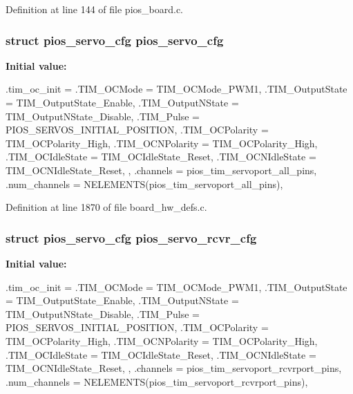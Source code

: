 \-Definition at line 144 of file pios\-\_\-board.\-c.

\hypertarget{group___flying_f3_ga57a87ef16d7949a9cc3589efc8d88a28}{
\subsubsection[{pios\-\_\-servo\-\_\-cfg}]{\setlength{\rightskip}{0pt plus 5cm}struct {\bf pios\-\_\-servo\-\_\-cfg} {\bf pios\-\_\-servo\-\_\-cfg}}}\label{group___flying_f3_ga57a87ef16d7949a9cc3589efc8d88a28}
{\bfseries \-Initial value\-:}
\begin{DoxyCode}
 {
        .tim_oc_init = {
                .TIM_OCMode = TIM_OCMode_PWM1,
                .TIM_OutputState = TIM_OutputState_Enable,
                .TIM_OutputNState = TIM_OutputNState_Disable,
                .TIM_Pulse = PIOS_SERVOS_INITIAL_POSITION,
                .TIM_OCPolarity = TIM_OCPolarity_High,
                .TIM_OCNPolarity = TIM_OCPolarity_High,
                .TIM_OCIdleState = TIM_OCIdleState_Reset,
                .TIM_OCNIdleState = TIM_OCNIdleState_Reset,
        },
        .channels = pios_tim_servoport_all_pins,
        .num_channels = NELEMENTS(pios_tim_servoport_all_pins),
}
\end{DoxyCode}


\-Definition at line 1870 of file board\-\_\-hw\-\_\-defs.\-c.

\hypertarget{group___flying_f3_gaa111328ef9a12c806ed1c24b93d4f663}{
\subsubsection[{pios\-\_\-servo\-\_\-rcvr\-\_\-cfg}]{\setlength{\rightskip}{0pt plus 5cm}struct {\bf pios\-\_\-servo\-\_\-cfg} {\bf pios\-\_\-servo\-\_\-rcvr\-\_\-cfg}}}\label{group___flying_f3_gaa111328ef9a12c806ed1c24b93d4f663}
{\bfseries \-Initial value\-:}
\begin{DoxyCode}
 {
        .tim_oc_init = {
                .TIM_OCMode = TIM_OCMode_PWM1,
                .TIM_OutputState = TIM_OutputState_Enable,
                .TIM_OutputNState = TIM_OutputNState_Disable,
                .TIM_Pulse = PIOS_SERVOS_INITIAL_POSITION,
                .TIM_OCPolarity = TIM_OCPolarity_High,
                .TIM_OCNPolarity = TIM_OCPolarity_High,
                .TIM_OCIdleState = TIM_OCIdleState_Reset,
                .TIM_OCNIdleState = TIM_OCNIdleState_Reset,
        },
        .channels = pios_tim_servoport_rcvrport_pins,
        .num_channels = NELEMENTS(pios_tim_servoport_rcvrport_pins),
}
\end{DoxyCode}


